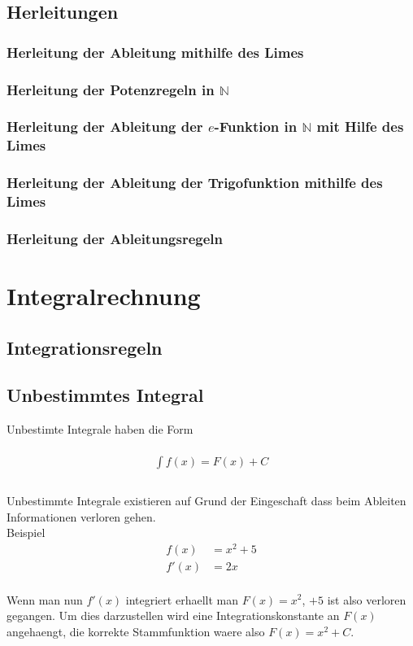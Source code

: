 \documentclass[a4paper]{article} %
\begin{document}
	\subsection{Herleitungen}
	\subsubsection{Herleitung der Ableitung mithilfe des Limes}
	\subsubsection{Herleitung der Potenzregeln in  $\mathbb{N}$}
	\subsubsection{Herleitung der Ableitung der $e$-Funktion in $\mathbb{N}$ mit Hilfe des Limes}
	\subsubsection{Herleitung der Ableitung der Trigofunktion mithilfe des Limes}
	\subsubsection{Herleitung der Ableitungsregeln}
	\pagebreak
	\section{Integralrechnung}
	\subsection{Integrationsregeln}
	\subsection{Unbestimmtes Integral}
	Unbestimte Integrale haben die Form\\\\
	\begin{align*}
	\int f(x)=F(x)+C\\
	\end{align*}\\
	Unbestimmte Integrale existieren auf Grund der Eingeschaft dass beim Ableiten Informationen verloren gehen.\\
	Beispiel\\
	\begin{align*}
	f(x) & =x^2+5\\
	f'(x) & =2x
	\end{align*}\\
	Wenn man nun $f'(x)$ integriert erhaellt man $F(x) =x^2$, $+5$ ist also verloren gegangen.
	Um dies darzustellen wird eine Integrationskonstante an $F(x)$ angehaengt, die korrekte Stammfunktion waere also $F(x)=x^2+C$.
\end{document}

